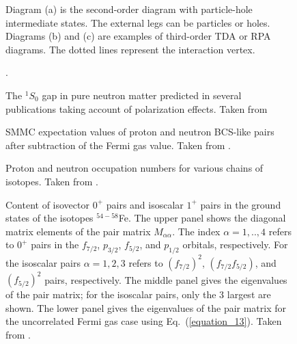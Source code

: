 \documentclass[rmp,preprint,aps,floatfix]{revtex4}
\begin{document}
\begin{figure}
\caption{Diagram (a) is the 
second-order diagram with particle-hole intermediate states. 
The external legs can be particles or holes. Diagrams (b) and (c) are examples
of third-order TDA or RPA diagrams. 
The dotted lines represent the interaction vertex.\label{fig:secondordercorelpol}}
\end{figure} 

\begin{figure}
\caption{The $^1S_0$ gap in pure neutron matter 
predicted in several publications
taking account of polarization effects.
Taken from \cite{ls2000}\label{fig:screening}}.
\end{figure}


\begin{figure}
\caption{SMMC expectation values of proton and neutron BCS-like pairs after
subtraction of the Fermi gas value. Taken from  \protect\cite{Langanke95}.}
\label{bcs_pairs}
\end{figure}


\begin{figure}
\caption{Proton and neutron occupation numbers for various chains of isotopes.
Taken from  \protect\cite{Langanke95}.}
\label{fp_occs}
\end{figure}


\begin{figure}
\caption{Content of isovector $0^+$ pairs and isoscalar $1^+$ pairs
in the ground states of the isotopes
$^{54-58}$Fe. The upper panel shows the
diagonal matrix elements of the pair matrix $M_{\alpha\alpha}$.
The index $\alpha=1,..,4$ refers to $0^+$ pairs in the
$f_{7/2}$, $p_{3/2}$, $f_{5/2}$, and $p_{1/2}$ orbitals, respectively.
For the isoscalar pairs $\alpha=1,2,3$ refers to $(f_{7/2})^2$,
$(f_{7/2}f_{5/2})$, and $(f_{5/2})^2$ pairs, respectively.
The middle panel gives the eigenvalues of the pair matrix; for the
isoscalar pairs, only the 3 largest are shown. The lower panel
gives the eigenvalues of the pair matrix for the uncorrelated Fermi gas case
using Eq.~(\ref{equation_13}). Taken from  \protect\cite{Langanke95b}.\label{fig_88}}

\end{figure}
\end{document}
